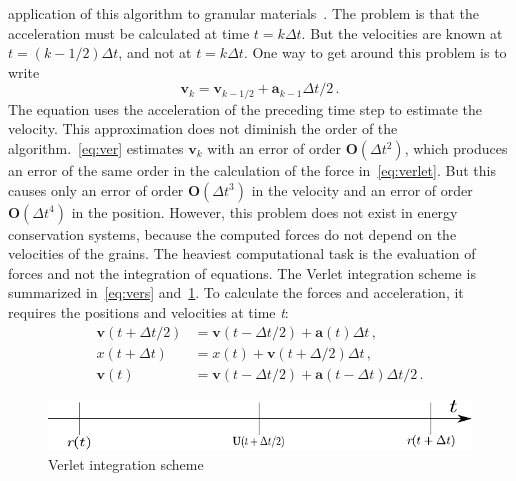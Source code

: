 application of this algorithm to granular materials~\citep{Radjai2011}. The 
problem is that the acceleration must be calculated at time $t=k\Delta t$. But 
the velocities are known at $t=(k - 1/2) \Delta t$, and not at $t=k \Delta 
t$. One way to get around this problem is to write
%
\begin{equation} 
\mathbf{v}_{\mathit{k}}={\mathbf{v}_{\mathit{k}-1/2}+{\mathbf{a}_{\mathit{k}-1}\Delta
 t/2}} \,.
\label{eq:ver}
\end{equation}
%
The equation uses the acceleration of the preceding time step to estimate the 
velocity. This approximation does not diminish the order of the 
algorithm.~\cref{eq:ver} estimates $\mathbf{v}_{k}$ with an error of order 
$\mathbf{O}(\Delta t^{2})$, which produces an error of the same order in the 
calculation of the force in~\cref{eq:verlet}. But this causes only an error of 
order $\mathbf{O}(\Delta t^{3})$ in the velocity and an error of order 
$\mathbf{O}(\Delta t^{4})$ in the position. However, this problem does not 
exist in energy conservation systems, because the computed forces do not depend 
on the velocities of the grains. The heaviest computational task is the 
evaluation of forces and not the integration of equations. The Verlet 
integration scheme is summarized in~\cref{eq:vers} and~\cref{fig:verlet}. To 
calculate the forces and acceleration, it requires the positions and velocities 
at time \textit{t}:
%
\begin{align}
\mathbf{v}(t+\Delta t/2) & =\mathbf{v}(t-\Delta t/2) + \mathbf{a}(t) \Delta t 
\nonumber \,, \\
x(t+\Delta t) & = x(t)+\mathbf{v}(t+\Delta /2) \Delta t  \,, \nonumber \\
 \mathbf{v}(t) & = \mathbf{v}(t-\Delta t /2)+\mathbf{a}(t- \Delta t) \Delta t 
 /2 \,.
\label{eq:vers}
\end{align}

\begin{figure}[tbhp]
\centering
\includegraphics{Leap}
\caption{Verlet integration scheme}
\label{fig:verlet}
\end{figure}

